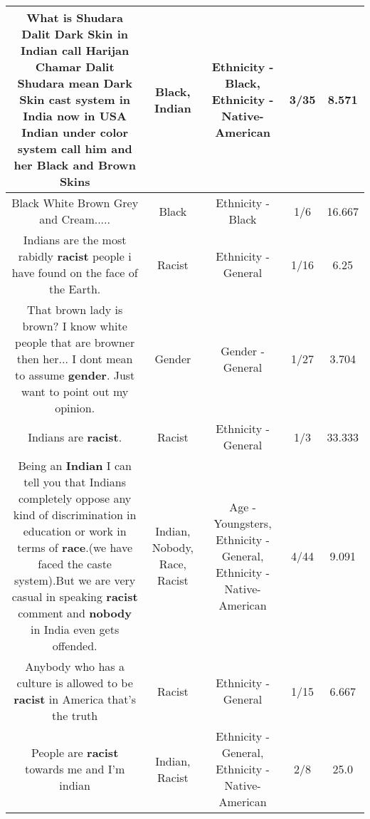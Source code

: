 \documentclass[11pt]{article}
\newlength\mylength
\begin{document}
\begin{center}
\begin{longtable}{|C{.65\mylength}|C{.30\mylength}|C{.12\mylength}|C{.12\mylength}|C{.12\mylength}|}
  \small What is Shudara Dalit Dark Skin in \textbf{Indian} call Harijan Chamar Dalit Shudara mean Dark Skin  cast system in India    now in USA \textbf{Indian} under color system call him and her \textbf{Black} and Brown Skins\normalsize   & Black, Indian & Ethnicity - Black, Ethnicity - Native-American & 3/35 & 8.571 \\  \hline
  \small Black White Brown Grey and Cream.....\normalsize   & Black & Ethnicity - Black & 1/6 & 16.667 \\  \hline
  \small Indians are the most rabidly \textbf{racist} people i have found on the face of the Earth.\normalsize   & Racist & Ethnicity - General & 1/16 & 6.25 \\  \hline
  \small That brown lady is brown? I know white people that are browner then her... I dont mean to assume \textbf{gender}. Just want to point out my opinion.\normalsize   & Gender & Gender - General & 1/27 & 3.704 \\  \hline
  \small Indians are \textbf{racist}.\normalsize   & Racist & Ethnicity - General & 1/3 & 33.333 \\  \hline
  \small Being an \textbf{Indian} I can tell you that Indians completely oppose any kind of discrimination in education or work in terms of \textbf{race}.(we have faced the caste system).But we are very casual in speaking \textbf{racist} comment and \textbf{nobody} in India even gets offended.\normalsize   & Indian, Nobody, Race, Racist & Age - Youngsters, Ethnicity - General, Ethnicity - Native-American & 4/44 & 9.091 \\  \hline
  \small Anybody who has a culture is allowed to be \textbf{racist} in America that's the truth\normalsize   & Racist & Ethnicity - General & 1/15 & 6.667 \\  \hline
  \small People are \textbf{racist} towards me and I'm indian\normalsize   & Indian, Racist & Ethnicity - General, Ethnicity - Native-American & 2/8 & 25.0 \\  \hline

\end{longtable}
\end{center}
\end{document}
